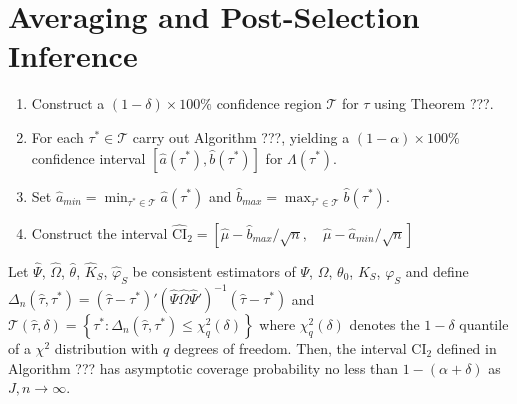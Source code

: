 \section{Averaging and Post-Selection Inference}
\label{sec:avg}





\begin{alg}[2-Step CI]
\mbox{}
\begin{enumerate}
  \item Construct a $(1-\delta)\times 100\%$ confidence region $\mathscr{T}$ for $\tau$ using Theorem ???. 
  \item For each $\tau^* \in \mathscr{T}$ carry out Algorithm ???, yielding a $(1 - \alpha)\times 100\%$ confidence interval $\left[\widehat{a}(\tau^*),\widehat{b}(\tau^*)\right]$ for $\Lambda(\tau^*)$.  
	\item Set $\displaystyle \widehat{a}_{min}=\min_{\tau^* \in \mathscr{T}} \widehat{a}(\tau^*)$ and $\displaystyle \widehat{b}_{max}= \max_{\tau^* \in \mathscr{T}} \widehat{b}(\tau^*)$. 
	\item Construct the interval 
    $ \widehat{\mbox{CI}}_{2}=\left[ \widehat{\mu} - \widehat{b}_{max}/\sqrt{n}, \quad \widehat{\mu} - \widehat{a}_{min}/\sqrt{n} \right]$
\end{enumerate}
\end{alg}


\begin{thm}[2-Step CI]
\label{thm:sim}
Let $\widehat{\Psi}$, $\widehat{\Omega}$, $\widehat{\theta}$, $\widehat{K}_S$, $\widehat{\varphi}_S$ be consistent estimators of $\Psi$, $\Omega$, $\theta_0$, $K_S$, $\varphi_S$ and define 
$\Delta_n(\widehat{\tau},\tau^*) = \left(\widehat{\tau} - \tau^*\right)' (\widehat{\Psi}\widehat{\Omega}\widehat{\Psi}')^{-1} \left(\widehat{\tau} - \tau^*\right)$ 
and 
$\mathscr{T}(\widehat{\tau},\delta) = \left\{\tau^* \colon  \Delta_n(\widehat{\tau},\tau^*) \leq \chi^2_q(\delta)\right\}$
where $\chi^2_q(\delta)$ denotes the $1-\delta$ quantile of a $\chi^2$ distribution with $q$ degrees of freedom.
Then, the interval $\mbox{CI}_{2}$ defined in Algorithm ??? has asymptotic coverage probability no less than $1-(\alpha + \delta)$ as $J,n\rightarrow \infty$.
\end{thm}




